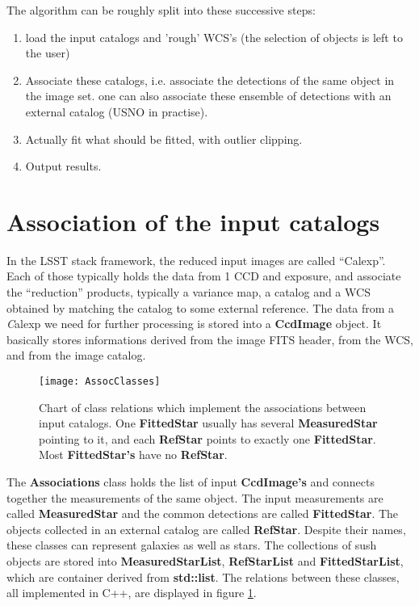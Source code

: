 \documentclass[a4paper,12pt]{scrartcl}
\newcommand{\ClName}[1]{{\bf #1}}
\def\bf{\normalfont\bfseries}
\begin{document}
The algorithm can be roughly split into these successive steps:
\begin{enumerate}
\item load the input catalogs and 'rough' WCS's (the selection
of objects is left to the user)
\item Associate these catalogs, i.e. associate the detections of the
same object in the image set. one can also associate
these ensemble of detections with an external catalog (USNO in practise).
\item Actually fit what should be fitted, with outlier clipping.
\item Output results.
\end{enumerate}


\section{Association of the input catalogs \label{sec:assoc}}
In the LSST stack framework, the reduced input images are called
``Calexp''. Each of those typically holds the data from 1 CCD
and exposure, and associate the ``reduction'' products, typically
a variance map, a catalog and a WCS obtained by matching the catalog to
some external reference. The data from a {\textit Calexp} we need for further
processing is stored into a \ClName{CcdImage} object. It basically
stores informations derived from the image FITS header, from the WCS,
and from the image catalog.

\begin{figure}[ht]
\centering
\texttt{[image: AssocClasses]}
\caption{Chart of class relations which implement the associations
between input catalogs. One \ClName{FittedStar} usually has several
\ClName{MeasuredStar} pointing to it, and each \ClName{RefStar} points 
to exactly one \ClName{FittedStar}. Most \ClName{FittedStar's} have no \ClName{RefStar}.
\label{fig:AssocClasses}
}
\end{figure}


The \ClName{Associations} class holds the list of input
\ClName{CcdImage's} and connects together the measurements of the same
object. The input measurements are called \ClName{MeasuredStar} and
the common detections are called \ClName{FittedStar}. The objects
collected in an external catalog are called \ClName{RefStar}.
Despite their
names, these classes can represent galaxies as well as stars. The
collections of sush objects are stored into \ClName{MeasuredStarList},
\ClName{RefStarList} 
and \ClName{FittedStarList}, which are container derived from \ClName
{std::list}. The relations between these classes, all implemented in C++,
are displayed in figure \ref{fig:AssocClasses}.
\end{document}
